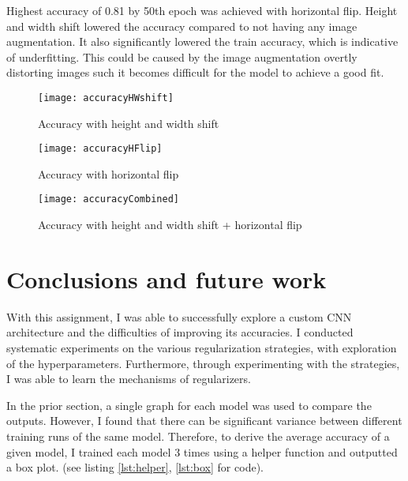 \documentclass{article}
\begin{document}
Highest accuracy of 0.81 by 50th epoch was achieved with horizontal flip. Height and width shift lowered the accuracy compared to not having any image augmentation. It also significantly lowered the train accuracy, which is indicative of underfitting. This could be caused by the image augmentation overtly distorting images such it becomes difficult for the model to achieve a good fit. 

\begin{figure}[H]
    \begin{center}
        \texttt{[image: accuracyHWshift]}
        \caption{Accuracy with height and width shift}
    \end{center}
\end{figure}

\begin{figure}[H]
    \begin{center}
        \texttt{[image: accuracyHFlip]}
        \caption{Accuracy with horizontal flip}
    \end{center}
\end{figure}

\begin{figure}[H]
    \begin{center}
        \texttt{[image: accuracyCombined]}
        \caption{Accuracy with height and width shift + horizontal flip}
    \end{center}
\end{figure}

\section{Conclusions and future work}

With this assignment, I was able to successfully explore a custom CNN architecture and the difficulties of improving its accuracies. I conducted systematic experiments on the various regularization strategies, with exploration of the hyperparameters. Furthermore, through experimenting with the strategies, I was able to learn the mechanisms of regularizers. 

In the prior section, a single graph for each model was used to compare the outputs. However, I found that there can be significant variance between different training runs of the same model. Therefore, to derive the average accuracy of a given model, I trained each model 3 times using a helper function and outputted a box plot. (see listing \ref{lst:helper}, \ref{lst:box} for code).
\end{document}
